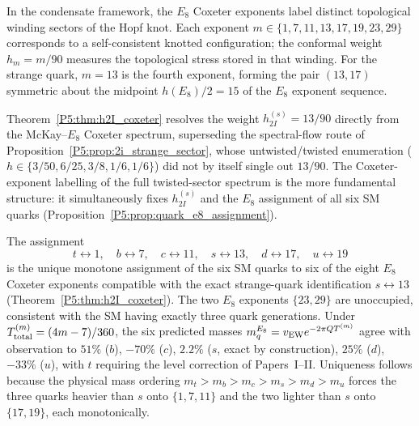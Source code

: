 \begin{remark}
\label{P5:rem:h2I_geometric}
In the condensate framework, the $E_8$ Coxeter exponents label distinct
topological winding sectors of the Hopf knot. Each exponent
$m\in\{1,7,11,13,17,19,23,29\}$ corresponds to a self-consistent
knotted configuration; the conformal weight $h_m=m/90$ measures the
topological stress stored in that winding. For the strange quark,
$m=13$ is the fourth exponent, forming the pair $(13,17)$ symmetric
about the midpoint $h(E_8)/2=15$ of the $E_8$ exponent sequence.
\end{remark}

\begin{remark}
\label{P5:rem:h2I_status}
Theorem~\ref{P5:thm:h2I_coxeter} resolves the weight $h_{2I}^{(s)}=13/90$
directly from the McKay--$E_8$ Coxeter spectrum, superseding the
spectral-flow route of Proposition~\ref{P5:prop:2i_strange_sector}, whose
untwisted/twisted enumeration ($h\in\{3/50,6/25,3/8,1/6,1/6\}$) did not
by itself single out $13/90$. The Coxeter-exponent labelling of the
full twisted-sector spectrum is the more fundamental structure: it
simultaneously fixes $h_{2I}^{(s)}$ and the $E_8$ assignment of all six
SM quarks (Proposition~\ref{P5:prop:quark_e8_assignment}).
\end{remark}

\begin{proposition}
\label{P5:prop:quark_e8_assignment}
The assignment
\begin{equation}
  t \leftrightarrow 1, \quad
  b \leftrightarrow 7, \quad
  c \leftrightarrow 11, \quad
  s \leftrightarrow 13, \quad
  d \leftrightarrow 17, \quad
  u \leftrightarrow 19
  \label{P5:eq:quark_e8}
\end{equation}
is the unique monotone assignment of the six SM quarks to six of the
eight $E_8$ Coxeter exponents compatible with the exact strange-quark
identification $s\leftrightarrow13$ (Theorem~\ref{P5:thm:h2I_coxeter}).
The two $E_8$ exponents $\{23,29\}$ are unoccupied, consistent with the
SM having exactly three quark generations. Under
$T_{\rm total}^{(m)}=(4m-7)/360$, the six predicted masses
$m_q^{E_8}=v_{\rm EW}e^{-2\pi QT^{(m)}}$ agree with observation to
$51\%$ ($b$), $-70\%$ ($c$), $\mathbf{2.2\%}$ ($s$, exact by
construction), $25\%$ ($d$), $-33\%$ ($u$), with $t$ requiring the
level correction of Papers~I--II. Uniqueness follows because the
physical mass ordering $m_t>m_b>m_c>m_s>m_d>m_u$ forces the three
quarks heavier than $s$ onto $\{1,7,11\}$ and the two lighter than $s$
onto $\{17,19\}$, each monotonically.
\end{proposition}

